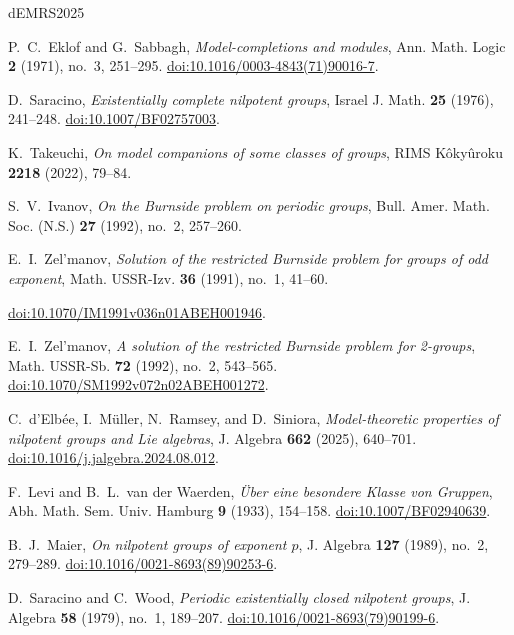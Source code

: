 \documentclass[11pt,reqno]{article}
\theoremstyle{definition}
\theoremstyle{remark}
\begin{document}
\begin{thebibliography}{dEMRS2025}

P.~C.~Eklof and G.~Sabbagh,
\emph{Model-completions and modules},
Ann. Math. Logic \textbf{2} (1971), no.~3, 251--295.
\href{https://doi.org/10.1016/0003-4843(71)90016-7}
     {doi:10.1016/0003-4843(71)90016-7}.

D.~Saracino,
\emph{Existentially complete nilpotent groups},
Israel J. Math. \textbf{25} (1976), 241--248.
\href{https://doi.org/10.1007/BF02757003}
     {doi:10.1007/BF02757003}.

K.~Takeuchi,
\emph{On model companions of some classes of groups},
RIMS K\^oky\^uroku \textbf{2218} (2022), 79--84.

S.~V.~Ivanov,
\emph{On the Burnside problem on periodic groups},
Bull. Amer. Math. Soc. (N.S.) \textbf{27} (1992), no.~2, 257--260.

E.~I.~Zel'manov,
\emph{Solution of the restricted Burnside problem for groups of odd exponent},
Math. USSR-Izv. \textbf{36} (1991), no.~1, 41--60.
\par\nopagebreak
\href{https://doi.org/10.1070/IM1991v036n01ABEH001946}
     {doi:10.1070/IM1991v036n01ABEH001946}.

E.~I.~Zel'manov,
\emph{A solution of the restricted Burnside problem for 2-groups},
Math. USSR-Sb. \textbf{72} (1992), no.~2, 543--565.
\href{https://doi.org/10.1070/SM1992v072n02ABEH001272}
     {doi:10.1070/SM1992v072n02ABEH001272}.

C.~d'Elb\'ee, I.~M\"uller, N.~Ramsey, and D.~Siniora,
\emph{Model-theoretic properties of nilpotent groups and Lie algebras},
J. Algebra \textbf{662} (2025), 640--701.
\href{https://doi.org/10.1016/j.jalgebra.2024.08.012}
     {doi:10.1016/j.jalgebra.2024.08.012}.

F.~Levi and B.~L.~van der Waerden,
\emph{\"Uber eine besondere Klasse von Gruppen},
Abh. Math. Sem. Univ. Hamburg \textbf{9} (1933), 154--158.
\href{https://doi.org/10.1007/BF02940639}
     {doi:10.1007/BF02940639}.

B.~J.~Maier,
\emph{On nilpotent groups of exponent $p$},
J. Algebra \textbf{127} (1989), no.~2, 279--289.
\href{https://doi.org/10.1016/0021-8693(89)90253-6}
     {doi:10.1016/0021-8693(89)90253-6}.

D.~Saracino and C.~Wood,
\emph{Periodic existentially closed nilpotent groups},
J. Algebra \textbf{58} (1979), no.~1, 189--207.
\href{https://doi.org/10.1016/0021-8693(79)90199-6}
     {doi:10.1016/0021-8693(79)90199-6}.

\end{thebibliography}
\end{document}
